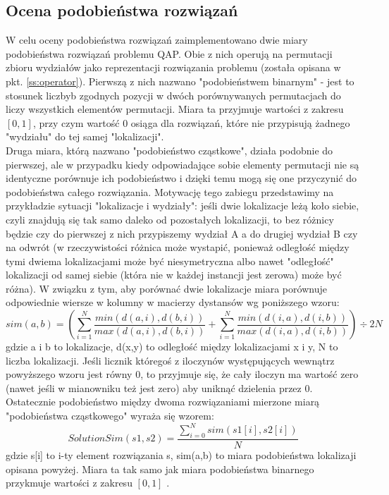 \documentclass{article}
\begin{document}
	\subsection{Ocena podobieństwa rozwiązań}
		W celu oceny podobieństwa rozwiązań zaimplementowano dwie miary podobieństwa rozwiązań problemu QAP. Obie z nich operują na permutacji zbioru wydziałów jako reprezentacji rozwiązania problemu (została opisana w pkt. \ref{ss:operator}). Pierwszą z nich nazwano "podobieństwem binarnym" - jest to stosunek liczbyb zgodnych pozycji w dwóch porównywanych permutacjach do liczy wszystkich elementów permutacji. Miara ta przyjmuje wartości z zakresu $[0,1]$, przy czym wartość 0 osiąga dla rozwiązań, które nie przypisują żadnego "wydziału" do tej samej "lokalizacji".
	\\Druga miara, którą nazwano "podobieństwo cząstkowe", działa podobnie do pierwszej, ale w przypadku kiedy odpowiadające sobie elementy permutacji nie są identyczne porównuje ich podobieństwo i dzięki temu mogą się one przyczynić do podobieństwa całego rozwiązania. Motywację tego zabiegu przedstawimy na przykładzie sytuacji "lokalizacje i wydziały": jeśli dwie lokalizacje leżą koło siebie, czyli znajdują się tak samo daleko od pozostałych lokalizacji, to bez różnicy będzie czy do pierwszej z nich przypiszemy wydział A a do drugiej wydział B czy na odwrót (w rzeczywistości różnica może wystapić, ponieważ odległość między tymi dwiema lokalizacjami może być niesymetryczna albo nawet "odległość" lokalizacji od samej siebie (która nie w każdej instancji jest zerowa) może być różna). W związku z tym, aby porównać dwie lokalizacje miara porównuje odpowiednie wiersze w kolumny w macierzy dystansów wg poniższego wzoru:
		$$ sim(a, b) = \left(\sum_{i=1}^{N}\frac{min(d(a,i), d(b,i))}{max(d(a,i), d(b,i))} +  \sum_{i=1}^{N}\frac{min(d(i,a), d(i,b))}{max(d(i,a), d(i,b))}\right) \div 2N  $$
		gdzie a i b to lokalizacje, d(x,y) to odległość między lokalizacjami x i y, N to liczba lokalizacji. Jeśli licznik któregoś z iloczynów występujących wewnątrz powyższego wzoru jest równy 0, to przyjmuje się, że cały iloczyn ma wartość zero (nawet jeśli w mianowniku też jest zero) aby uniknąć dzielenia przez 0.
\\Ostatecznie podobieństwo między dwoma rozwiązaniami mierzone miarą "podobieństwa cząstkowego" wyraża się wzorem:
$$ SolutionSim(s1, s2) = \frac{\sum_{i=0}^{N}{sim(s1[i], s2[i])}}{N}$$	
		gdzie s[i] to i-ty element rozwiązania s, sim(a,b) to miara podobieństwa lokalizaji opisana powyżej.
		Miara ta tak samo jak miara podobieństwa binarnego przykmuje wartości z zakresu $ [0,1] $ .
\end{document}
